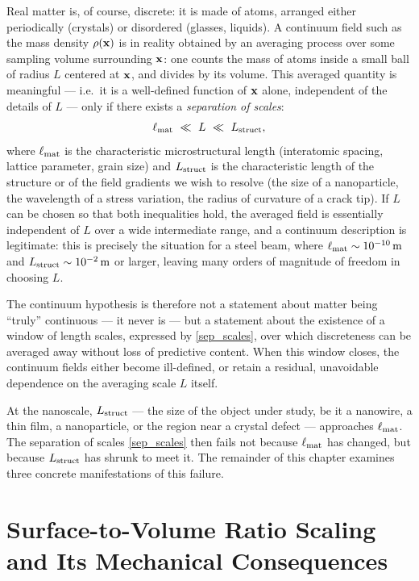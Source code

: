Real matter is, of course, discrete: it is made of atoms, arranged either periodically (crystals) or disordered (glasses, liquids). A continuum field such as the mass density $\rho(\mathbf{x})$ is in reality obtained by an averaging process over some sampling volume surrounding $\mathbf{x}$: one counts the mass of atoms inside a small ball of radius $L$ centered at $\mathbf{x}$, and divides by its volume. This averaged quantity is meaningful --- i.e.\ it is a well-defined function of $\mathbf{x}$ alone, independent of the details of $L$ --- only if there exists a \textit{separation of scales}:
\begin{equation}\label{sep_scales}
	\ell_{\rm mat}\ \ll\ L\ \ll\ L_{\rm struct},
\end{equation}
where $\ell_{\rm mat}$ is the characteristic microstructural length (interatomic spacing, lattice parameter, grain size) and $L_{\rm struct}$ is the characteristic length of the structure or of the field gradients we wish to resolve (the size of a nanoparticle, the wavelength of a stress variation, the radius of curvature of a crack tip). If $L$ can be chosen so that both inequalities hold, the averaged field is essentially independent of $L$ over a wide intermediate range, and a continuum description is legitimate: this is precisely the situation for a steel beam, where $\ell_{\rm mat}\sim 10^{-10}\,\mathrm{m}$ and $L_{\rm struct}\sim 10^{-2}\,\mathrm{m}$ or larger, leaving many orders of magnitude of freedom in choosing $L$.

\begin{remark}
	The continuum hypothesis is therefore not a statement about matter being ``truly'' continuous --- it never is --- but a statement about the existence of a window of length scales, expressed by \eqref{sep_scales}, over which discreteness can be averaged away without loss of predictive content. When this window closes, the continuum fields either become ill-defined, or retain a residual, unavoidable dependence on the averaging scale $L$ itself.
\end{remark}

At the nanoscale, $L_{\rm struct}$ --- the size of the object under study, be it a nanowire, a thin film, a nanoparticle, or the region near a crystal defect --- approaches $\ell_{\rm mat}$. The separation of scales \eqref{sep_scales} then fails not because $\ell_{\rm mat}$ has changed, but because $L_{\rm struct}$ has shrunk to meet it. The remainder of this chapter examines three concrete manifestations of this failure.

\section{Surface-to-Volume Ratio Scaling and Its Mechanical Consequences}

